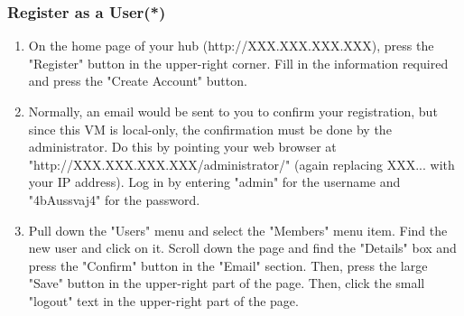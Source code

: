\documentclass[10pt,letterpaper,titlepage]{article}
\begin{document}
\subsubsection{Register as a User(*)}
\begin{enumerate}
\item On the home page of your hub (http://XXX.XXX.XXX.XXX), press the "Register" button in the upper-right corner. Fill in the information required and press the "Create Account" button.
\item Normally, an email would be sent to you to confirm your registration, but since this VM is local-only, the confirmation must be done by the administrator. Do this by pointing your web browser at "http://XXX.XXX.XXX.XXX/administrator/" (again replacing XXX... with your IP address). Log in by entering "admin" for the username and "4bAussvaj4" for the password.
\item Pull down the "Users" menu and select the "Members" menu item. Find the new user and click on it. Scroll down the page and find the "Details" box and press the "Confirm" button in the "Email" section. Then, press the large "Save" button in the upper-right part of the page. Then, click the small "logout" text in the upper-right part of the page.
\end{enumerate}
\end{document}
